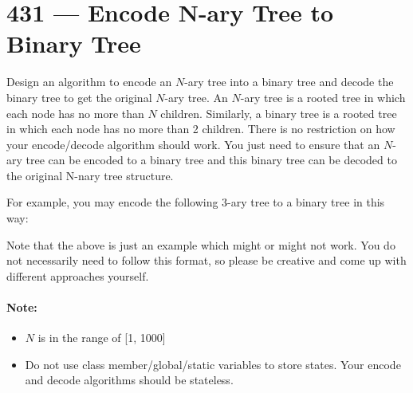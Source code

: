 \section{431 --- Encode N-ary Tree to Binary Tree}
Design an algorithm to encode an $N$-ary tree into a binary tree and decode the binary tree to get the original $N$-ary tree. An $N$-ary tree is a rooted tree in which each node has no more than $ N $ children. Similarly, a binary tree is a rooted tree in which each node has no more than 2 children. There is no restriction on how your encode/decode algorithm should work. You just need to ensure that an $ N $-ary tree can be encoded to a binary tree and this binary tree can be decoded to the original N-nary tree structure.

For example, you may encode the following 3-ary tree to a binary tree in this way:

\begin{figure}[H]
\end{figure}


Note that the above is just an example which might or might not work. You do not necessarily need to follow this format, so please be creative and come up with different approaches yourself.

\paragraph{Note:}

\begin{itemize}
\item $ N $ is in the range of [1, 1000]
\item Do not use class member/global/static variables to store states. Your encode and decode algorithms should be stateless.
\end{itemize}
